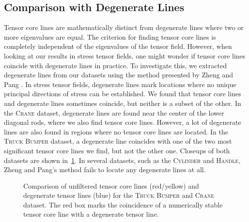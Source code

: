 \subsection{Comparison with Degenerate Lines} %
\label{sub:comparison_with_degenerate_lines}
%
Tensor core lines are mathematically distinct from degenerate lines where two or
more eigenvalues are equal.
%
The criterion for finding tensor core lines is completely independent of the
eigenvalues of the tensor field.
%
However, when looking at our results in stress tensor fields, one might wonder
if tensor core lines coincide with degenerate lines in practice.
%
To investigate this, we extracted degenerate lines from our datasets using the
method presented by Zheng and Pang \cite{Zheng2004}.
%
In stress tensor fields, degenerate lines mark locations where no unique
principal directions of stress can be established.
%
We found that tensor core lines and degenerate lines sometimes coincide, but
neither is a subset of the other.
%
In the \textsc{Crane} dataset, degenerate lines are found near the center of the
lower diagonal rods, where we also find tensor core lines.
%
However, a lot of degenerate lines are also found in regions where no tensor
core lines are located.
%
In the \textsc{Truck Bumper} dataset, a degenerate line coincides with one of
the two most significant tensor core lines we find, but not the other one.
%
Closeups of both datasets are shown in~\cref{fig:topo_comparison}.
%
In several datasets, such as the \textsc{Cylinder} and \textsc{Handle}, Zheng
and Pang's method fails to locate any degenerate lines at all.
%
\begin{figure}[p]
    \begin{captionbeside}{Comparison of unfiltered tensor core lines
    (red/yellow) and degenerate tensor lines (blue) for the \textsc{Truck
    Bumper} and \textsc{Crane} dataset. The red box marks the
    coincidence of a numerically stable tensor core line with a degenerate
    tensor line.\label{fig:topo_comparison}}
        \setlength{\figurewidth}{0.7\textwidth}
        
    \end{captionbeside}
\end{figure}
%
%
